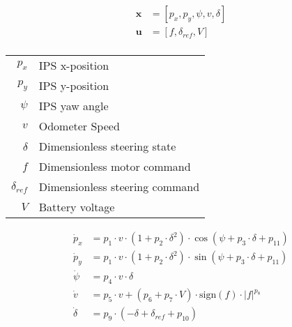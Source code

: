 \begin{align}
\boldsymbol{x} &= [p_x, p_y, \psi, v, \delta] \\
\boldsymbol{u} &= [f, \delta_{ref}, V] \\ 
\end{align}



\begin{center}
\begin{tabular}{ r | l }
 $p_x$ & IPS x-position  \\ 
 $p_y$ & IPS y-position   \\ 
 $\psi$ & IPS yaw angle  \\ 
 $v$ & Odometer Speed  \\ 
 $\delta$ & Dimensionless steering state \\ 
 $f$ & Dimensionless motor command  \\ 
 $\delta_{ref}$ & Dimensionless steering command  \\ 
 $V$ & Battery voltage  \\ 
\end{tabular}
\end{center}


\begin{align}
\dot{p}_x &= p_1 \cdot v \cdot (1+p_2 \cdot \delta^2) \cdot \cos(\psi + p_3 \cdot \delta + p_{11}) \\
\dot{p}_y &= p_1 \cdot v \cdot (1+p_2 \cdot \delta^2) \cdot \sin(\psi + p_3 \cdot \delta + p_{11}) \\
\dot{\psi} &= p_4 \cdot v \cdot \delta \\
\dot{v} &= p_5 \cdot v + (p_6 + p_7 \cdot V) \cdot \text{sign}(f) \cdot |f|^{p_8} \\
\dot{\delta} &= p_9 \cdot (-\delta + \delta_{ref} + p_{10})
\end{align}
